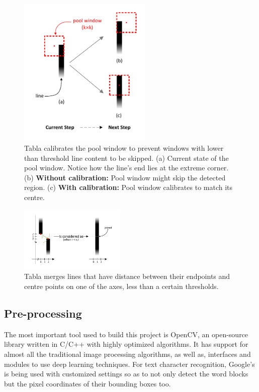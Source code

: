 \documentclass[10pt,journal,compsoc]{IEEEtran}
\begin{document}
\begin{figure}[!t]
\centering
\includegraphics[width=2.5in]{figures/calibration.pdf}
\caption{Tabla calibrates the pool window to prevent windows with lower than threshold line content to be skipped. (a) Current state of the pool window. Notice how the line's end lies at the extreme corner. (b) \textbf{Without calibration:} Pool window might skip the detected region. (c) \textbf{With calibration:} Pool window calibrates to match its centre.}
\label{fig:calibration}
\end{figure}

\begin{figure}[!t]
\centering
\includegraphics[width=0.45\textwidth]{figures/cleanLines.pdf}
\caption{Tabla merges lines that have distance between their endpoints and centre points on one of the axes, less than a certain thresholds.}
\label{fig:cleanLines}
\end{figure}

\subsection{Pre-processing}
The most important tool used to build this project is OpenCV, an open-source library written in C/C++ with highly optimized algorithms. It has support for almost all the traditional image processing algorithms, as well as, interfaces and modules to use deep learning techniques. For text character recognition, Google's  is being used with customized settings so as to not only detect the word blocks but the pixel coordinates of their bounding boxes too.
\end{document}
